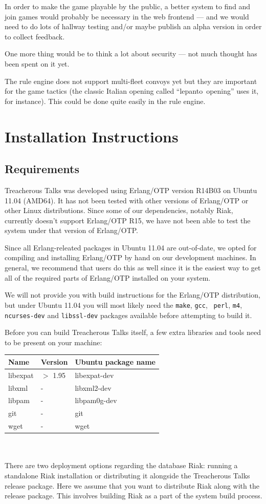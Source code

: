 \documentclass[11pt,a4paper]{report}
\begin{document}
In order to make the game playable by the public, a better system to find and
join games would probably be necessary in the web frontend --- and we would
need to do lots of hallway testing and/or maybe publish an alpha version in
order to collect feedback.

One more thing would be to think a lot about security --- not much thought has
been spent on it yet.

The rule engine does not support multi-fleet convoys yet but they are important
for the game tactics (the classic Italian opening called ``lepanto~opening''
uses it, for instance). This could be done quite easily in the rule engine.

\appendix
\chapter{Installation Instructions}
\section{Requirements}
Treacherous Talks was developed using Erlang/OTP version R14B03 on Ubuntu 11.04
(AMD64). It has not been tested with other versions of Erlang/OTP or other Linux
distributions. Since some of our dependencies, notably Riak, currently doesn't
support Erlang/OTP R15, we have not been able to test the system under that
version of Erlang/OTP.

Since all Erlang-releated packages in Ubuntu 11.04 are out-of-date, we opted for
compiling and installing Erlang/OTP by hand on our development machines. In
general, we recommend that users do this as well since it is the easiest way to
get all of the required parts of Erlang/OTP installed on your system.

We will not provide you with build instructions for the Erlang/OTP distribution,
but under Ubuntu 11.04 you will most likely need the {\tt make}, {\tt gcc}, {\tt
  perl}, {\tt m4}, {\tt ncurses-dev} and {\tt libssl-dev} packages available
before attempting to build it.

Before you can build Treacherous Talks itself, a few extra libraries and tools
need to be present on your machine: \\

\begin{tabular}{lll}
  Name & Version & Ubuntu package name \\ \hline
  libexpat & $>$ 1.95 & libexpat-dev \\
  libxml   & -        & libxml2-dev \\
  libpam   & -        & libpam0g-dev \\
  git      & -        & git \\
  wget     & -        & wget \\
\end{tabular} \\
\\
There are two deployment options regarding the database Riak: running a
standalone Riak installation or distributing it alongside the Treacherous Talks
release package. Here we assume that you want to distribute Riak along with the
release package. This involves building Riak as a part of the system build
process.
\end{document}
